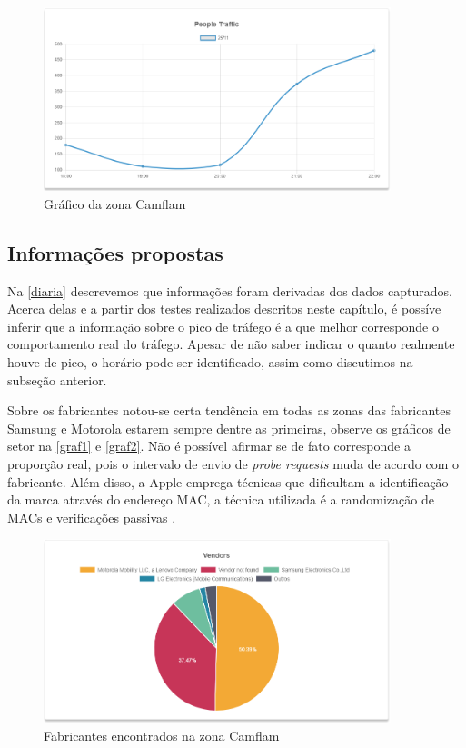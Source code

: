 \begin{figure}[!h]
  \caption{\label{camflam-graph}Gráfico da zona Camflam}
  \begin{center}
    \includegraphics[width=0.90\textwidth]{img/camflam-graph.png}
  \end{center}
\end{figure}

\subsection{Informações propostas}
Na \autoref{diaria} descrevemos que informações foram derivadas dos dados capturados. Acerca delas e a partir
dos testes realizados descritos neste capítulo, é possíve inferir que a informação sobre o pico de tráfego
é a que melhor corresponde o comportamento real do tráfego. Apesar de não saber indicar o quanto realmente houve de pico, o
horário pode ser identificado, assim como discutimos na subseção anterior.

Sobre os fabricantes notou-se certa tendência em todas as zonas das fabricantes Samsung e Motorola estarem
sempre dentre as primeiras, observe os gráficos de setor na \autoref{graf1} e \autoref{graf2}. Não é possível afirmar se de fato corresponde a proporção real, pois o intervalo de envio
de \emph{probe requests} muda de acordo com o fabricante. Além disso, a Apple emprega técnicas que dificultam
a identificação da marca através do endereço MAC, a técnica utilizada é a randomização de MACs e verificações passivas \cite{Apple2016}.

\begin{figure}[!h]
  \caption{\label{graf1}Fabricantes encontrados na zona Camflam}
  \begin{center}
    \includegraphics[width=0.90\textwidth]{img/setor-camflam.png}
  \end{center}
\end{figure}

